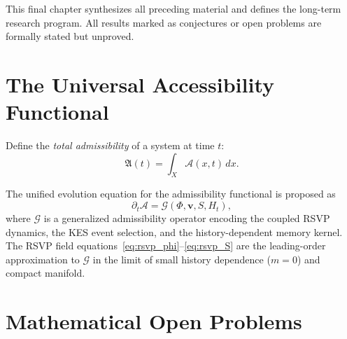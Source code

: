 \documentclass[11pt, openright, twoside]{book}
\theoremstyle{plain}
\theoremstyle{definition}
\theoremstyle{remark}
\newcommand{\vfield}{\mathbf{v}}
\newcommand{\Sfield}{S}
\newcommand{\Admiss}{\mathcal{A}}
\newcommand{\Traj}{X}
\begin{document}
\begin{depbox}
This final chapter synthesizes all preceding material and defines the long-term research
program. All results marked as conjectures or open problems are formally stated but unproved.
\end{depbox}

\section{The Universal Accessibility Functional}

Define the \emph{total admissibility} of a system at time $t$:
\begin{equation}
  \mathfrak{A}(t) = \int_\Traj\Admiss(x,t)\,dx.
\end{equation}

The unified evolution equation for the admissibility functional is proposed as
\begin{equation}
  \partial_t\Admiss = \mathcal{G}(\Phi,\vfield,\Sfield,H_t),
\end{equation}
where $\mathcal{G}$ is a generalized admissibility operator encoding the coupled RSVP
dynamics, the KES event selection, and the history-dependent memory kernel. The RSVP
field equations~\eqref{eq:rsvp_phi}--\eqref{eq:rsvp_S} are the leading-order approximation
to $\mathcal{G}$ in the limit of small history dependence ($m=0$) and compact manifold.

\section{Mathematical Open Problems}
\end{document}
